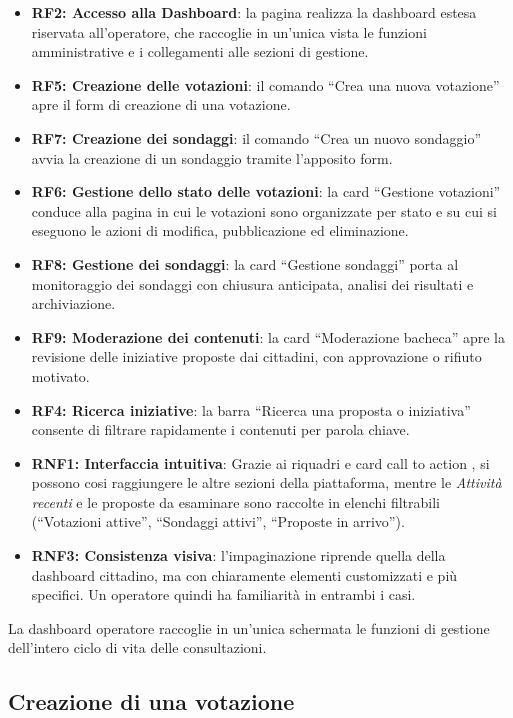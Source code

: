 \documentclass{article}
\begin{document}
\begin{itemize}
    \item \textbf{RF2: Accesso alla Dashboard}: la pagina realizza la dashboard estesa riservata all'operatore, che raccoglie in un'unica vista le funzioni amministrative e i collegamenti alle sezioni di gestione.
    \item \textbf{RF5: Creazione delle votazioni}: il comando ``Crea una nuova votazione'' apre il form di creazione di una votazione.
    \item \textbf{RF7: Creazione dei sondaggi}: il comando ``Crea un nuovo sondaggio'' avvia la creazione di un sondaggio tramite l'apposito form.
    \item \textbf{RF6: Gestione dello stato delle votazioni}: la card ``Gestione votazioni'' conduce alla pagina in cui le votazioni sono organizzate per stato e su cui si eseguono le azioni di modifica, pubblicazione ed eliminazione.
    \item \textbf{RF8: Gestione dei sondaggi}: la card ``Gestione sondaggi'' porta al monitoraggio dei sondaggi con chiusura anticipata, analisi dei risultati e archiviazione.
    \item \textbf{RF9: Moderazione dei contenuti}: la card ``Moderazione bacheca'' apre la revisione delle iniziative proposte dai cittadini, con approvazione o rifiuto motivato.
    \item \textbf{RF4: Ricerca iniziative}: la barra ``Ricerca una proposta o iniziativa'' consente di filtrare rapidamente i contenuti per parola chiave.
    \item \textbf{RNF1: Interfaccia intuitiva}: Grazie ai riquadri e card call to action , si possono cosi raggiungere le altre sezioni della piattaforma, mentre le \emph{Attivit\`a recenti} e le proposte da esaminare sono raccolte in elenchi filtrabili (``Votazioni attive'', ``Sondaggi attivi'', ``Proposte in arrivo'').
    \item \textbf{RNF3: Consistenza visiva}: l'impaginazione riprende quella della dashboard cittadino, ma con chiaramente elementi customizzati e più specifici. Un operatore quindi ha familiarità in entrambi i casi.
\end{itemize}

La dashboard operatore raccoglie in un'unica schermata le funzioni di gestione dell'intero ciclo di vita delle consultazioni.


\subsection*{Creazione di una votazione}
\end{document}
